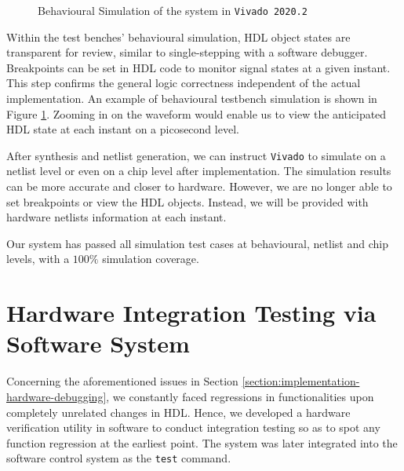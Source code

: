 \documentclass[a4paper]{report}
\newcommand{\code}{\texttt}
\begin{document}
\begin{figure}[h!]
  \caption{Behavioural Simulation of the system in \code{Vivado 2020.2}}
  \label{fig:behavioural-simulation-fpga}
\end{figure}

Within the test benches' behavioural simulation, HDL object states are transparent for review, similar to single-stepping with a software debugger. Breakpoints can be set in HDL code to monitor signal states at a given instant. This step confirms the general logic correctness independent of the actual implementation. An example of behavioural testbench simulation is shown in Figure \ref{fig:behavioural-simulation-fpga}. Zooming in on the waveform would enable us to view the anticipated HDL state at each instant on a picosecond level.

After synthesis and netlist generation, we can instruct \code{Vivado} to simulate on a netlist level or even on a chip level after implementation. The simulation results can be more accurate and closer to hardware. However, we are no longer able to set breakpoints or view the HDL objects. Instead, we will be provided with hardware netlists information at each instant.

Our system has passed all simulation test cases at behavioural, netlist and chip levels, with a $100\%$ simulation coverage.

\section{Hardware Integration Testing via Software System}

Concerning the aforementioned issues in Section \ref{section:implementation-hardware-debugging}, we constantly faced regressions in functionalities upon completely unrelated changes in HDL. Hence, we developed a hardware verification utility in software to conduct integration testing so as to spot any function regression at the earliest point. The system was later integrated into the software control system as the \code{test} command. 
\end{document}
